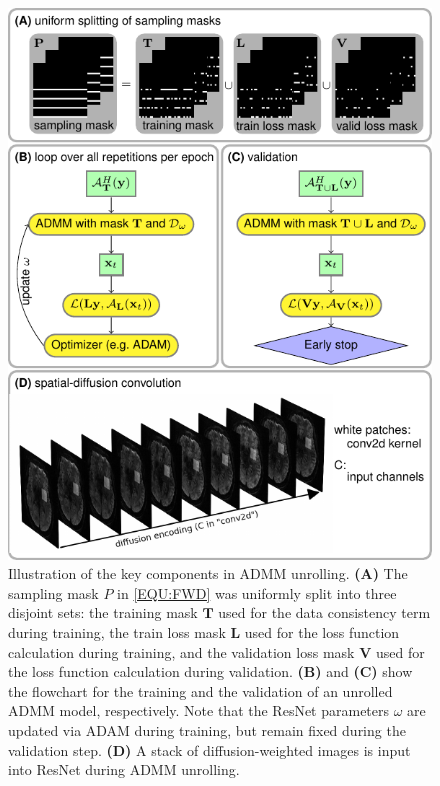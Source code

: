 \documentclass[journal,twoside,web]{ieeecolor}
\begin{document}
	\begin{figure}
		\centering
		\includegraphics[width=\columnwidth]{../figures/fig1.pdf}
		\caption{Illustration of the key components in ADMM unrolling.
			\textbf{(A)} The sampling mask $P$ in \cref{EQU:FWD} was
			uniformly split into three disjoint sets:
			the training mask $\mathbf{T}$ used for
			the data consistency term during training,
			the train loss mask $\mathbf{L}$ used for
			the loss function calculation during training, and
			the validation loss mask $\mathbf{V}$ used for
			the loss function calculation during validation.
			\textbf{(B)} and \textbf{(C)} show the flowchart
			for the training and the validation of an unrolled ADMM model, respectively.
			Note that the ResNet parameters $\omega$ are updated 
			via ADAM \cite{kingma_2015_adam} during training,
			but remain fixed during the validation step.
			\textbf{(D)} A stack of diffusion-weighted images 
			is input into ResNet during ADMM unrolling.}
		\label{FIG:ZSSSL}
	\end{figure}
\end{document}
